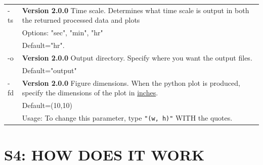 \documentclass[12pt]{article}
\begin{document}
\begin{center}
\begin{xltabular}{\textwidth}{lX}
\hline
-ts & \textbf{Version 2.0.0} Time scale. Determines what time scale is output in both the returned processed data and plots\\
 & Options: "sec", "min", "hr"\\
 & Default="hr".\\
\hline
-o & \textbf{Version 2.0.0} Output directory. Specify where you want the output files.\\
 & Default="output"\\
\hline
-fd & \textbf{Version 2.0.0} Figure dimensions. When the python plot is produced, specify the dimensions of the plot in \uline{inches}.\\
 & Default=(10,10)\\
 & Usage: To change this parameter, type \texttt{"(w, h)"} WITH the quotes.\\
\end{xltabular}
\end{center}

\section*{S4: HOW DOES IT WORK}
\label{sec:orgd3fa91d}
\end{document}
